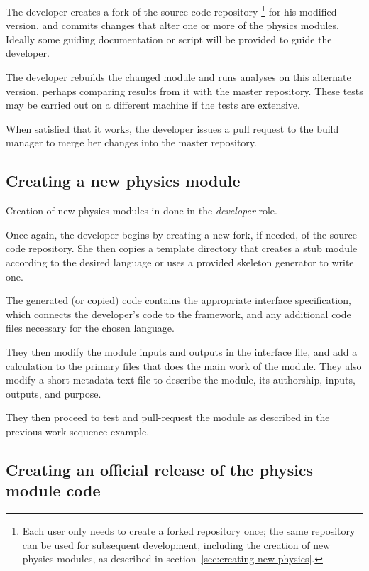 \documentclass{memarticle}
\begin{document}
The developer creates a fork of the source code repository%
\footnote{Each user only needs to create a forked repository once; the
  same repository can be used for subsequent development, including the
  creation of new physics modules, as described in
  section~\ref{sec:creating-new-physics}.}
for his modified version,
and commits changes that alter one or more of the physics modules.
Ideally some guiding documentation or script will be provided to guide
the developer.

The developer rebuilds the changed module and runs analyses on this
alternate version, perhaps comparing results from it with the
master repository.  These tests may be carried out on a different machine if the
tests are extensive.

When satisfied that it works, the developer issues a pull
request to the build manager to merge her changes into the master
repository.

\subsection{Creating a new physics module\label{sec:creating-new-physics}}

Creation of new physics modules in done in the \emph{developer} role.

Once again, the developer begins by creating a new fork, if needed, of the source code
repository. She then copies a template directory
that creates a stub module according to the desired language or uses a provided skeleton generator to write one.

The generated (or copied) code contains the appropriate interface
specification,
which connects the developer's code to the
framework, and any additional code files necessary for the chosen language.

They then modify the module inputs and outputs in the interface file,
and add a
calculation to the primary files that does the main work of the module.
They also modify a short metadata text file to describe the
module, its authorship, inputs, outputs, and purpose.

They then proceed to test and pull-request the module as described in the
previous work sequence example.

\subsection{Creating an official release of the physics module code}
\end{document}
